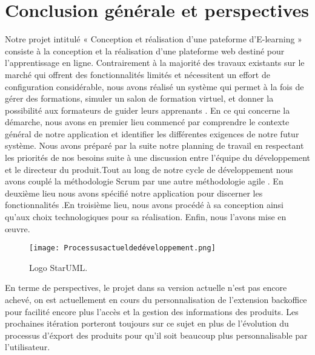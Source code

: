 
\chapter*{Conclusion générale et perspectives}
\label{sec:conclusion}
Notre projet intitulé « Conception et réalisation d’une pateforme d’E-learning » consiste à la conception et la réalisation d’une plateforme web destiné pour l’apprentissage en ligne.
\medskip
Contrairement à la majorité des travaux existants sur le marché qui offrent des fonctionnalités
limités et nécessitent un effort de configuration considérable, nous avons réalisé un système
qui permet à la fois de gérer des formations, simuler un salon de formation virtuel, et donner la possibilité aux formateurs de guider leurs apprenants .
\medskip
En ce qui concerne la démarche, nous avons en premier lieu 
commencé  par comprendre le contexte général de notre application et identifier les différentes exigences de notre futur système. Nous avons préparé par la suite notre planning de travail en respectant les priorités de nos besoins suite à une discussion entre l'équipe du développement et le directeur du produit.Tout au long de notre cycle de développement nous avons couplé la méthodologie Scrum par une autre méthodologie agile . En deuxième lieu nous avons spécifié notre application pour
discerner les fonctionnalités .En troisième lieu, nous avons procédé à sa conception ainsi
qu’aux choix technologiques pour sa réalisation. Enfin, nous l’avons mise en œuvre.
	\begin{figure}[ht]
	\centering
	\texttt{[image: Processusactueldedéveloppement.png]}
	\caption{Logo StarUML.}
	\label{fig:StarUML }
\end{figure}
\FloatBarrier
\medskip
En terme de perspectives, le projet dans sa version actuelle n’est pas encore achevé, on est actuellement en cours du personnalisation de l'extension backoffice pour facilité encore plus l'accès et la gestion des informations des produits. Les prochaines itération porteront toujours sur ce sujet en plus de l'évolution du processus d'éxport des produits pour qu'il soit beaucoup plus personnalisable par l'utilisateur.
\medskip
    

    


